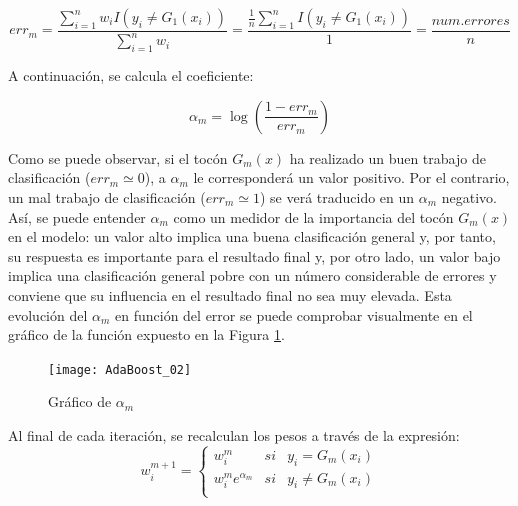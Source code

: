 \documentclass[12pt,twoside]{article}
\begin{document}
\begin{equation*}
err_m = \frac{\sum_{i=1}^{n} w_i I(y_i \neq G_1(x_i))}{\sum_{i=1}^{n} w_i} = \frac{\frac{1}{n} \sum_{i=1}^{n}I(y_i \neq G_1(x_i))}{1} = \frac{num.errores}{n}
\end{equation*}

A continuación, se calcula el coeficiente:

\begin{equation*}
\alpha _m = \log \left( \frac{1 - err_m}{err_m} \right)
\end{equation*}

Como se puede observar, si el tocón $G_m(x)$ ha realizado un buen trabajo de clasificación ($err_m \simeq 0$), a $\alpha_m$ le corresponderá un valor positivo. Por el contrario, un mal trabajo de clasificación ($err_m \simeq 1$) se verá traducido en un $\alpha_m$ negativo. Así, se puede entender $\alpha_m$ como un medidor de la importancia del tocón $G_m(x)$ en el modelo: un valor alto implica una buena clasificación general y, por tanto, su respuesta es importante para el resultado final y, por otro lado, un valor bajo implica una clasificación general pobre con un número considerable de errores y conviene que su influencia en el resultado final no sea muy elevada. Esta evolución del $\alpha_m$ en función del error se puede comprobar visualmente en el gráfico de la función expuesto en la Figura \ref{fig: AdaBoost_02}.

\begin{figure}[h]
\centering
\texttt{[image: AdaBoost\_02]}
\caption{Gráfico de $\alpha_m$}
\label{fig: AdaBoost_02}
\end{figure}

Al final de cada iteración, se recalculan los pesos a través de la expresión:
\begin{equation*}
w_i^{m+1} =
\left\{
\begin{array}{crl}
w_i^m & si & y_i = G_m(x_i) \\
w_i^m e^{\alpha_m} & si & y_i \neq G_m(x_i) \\
\end{array}
\right.
\end{equation*}
\end{document}
